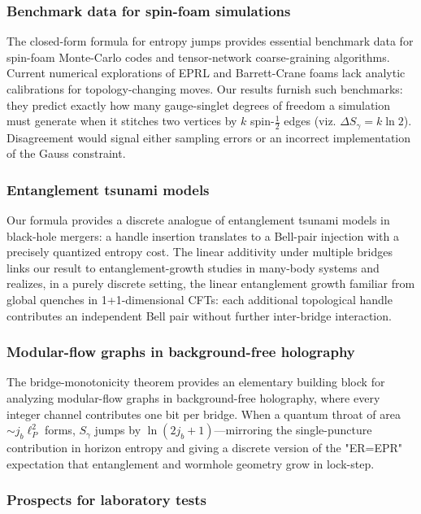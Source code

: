 \documentclass[11pt, a4paper]{article}
\theoremstyle{plain}
\theoremstyle{definition}
\theoremstyle{remark}
\begin{document}
\subsubsection{Benchmark data for spin-foam simulations}

The closed-form formula for entropy jumps provides essential benchmark data for spin-foam Monte-Carlo codes and tensor-network coarse-graining algorithms. Current numerical explorations of EPRL and Barrett-Crane foams \cite{ChircoOritiRaskin2018,CharlesLivine2024} lack analytic calibrations for topology-changing moves. Our results furnish such benchmarks: they predict exactly how many gauge-singlet degrees of freedom a simulation must generate when it stitches two vertices by $k$ spin-$\frac{1}{2}$ edges (viz. $\Delta S_{\gamma} = k\ln 2$). Disagreement would signal either sampling errors or an incorrect implementation of the Gauss constraint.

\subsubsection{Entanglement tsunami models}

Our formula provides a discrete analogue of entanglement tsunami models in black-hole mergers: a handle insertion translates to a Bell-pair injection with a precisely quantized entropy cost. The linear additivity under multiple bridges links our result to entanglement-growth studies in many-body systems \cite{AlbaCalabrese2017} and realizes, in a purely discrete setting, the linear entanglement growth familiar from global quenches in 1+1-dimensional CFTs: each additional topological handle contributes an independent Bell pair without further inter-bridge interaction.

\subsubsection{Modular-flow graphs in background-free holography}

The bridge-monotonicity theorem provides an elementary building block for analyzing modular-flow graphs in background-free holography, where every integer channel contributes one bit per bridge. When a quantum throat of area $\sim j_b\ell_P^2$ forms, $S_{\gamma}$ jumps by $\ln(2j_b+1)$—mirroring the single-puncture contribution in horizon entropy and giving a discrete version of the "ER=EPR" expectation that entanglement and wormhole geometry grow in lock-step.

\subsubsection{Prospects for laboratory tests}
\end{document}
